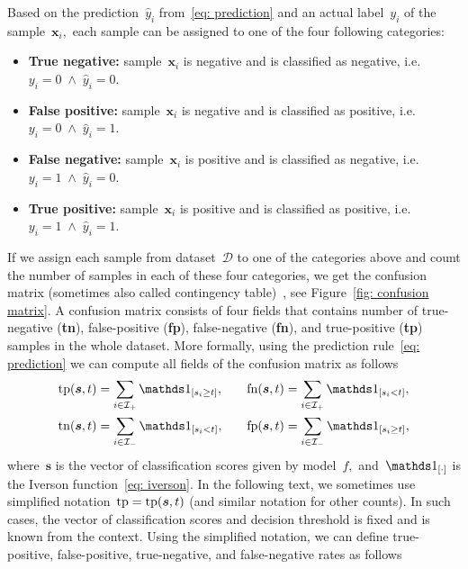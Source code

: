 Based on the prediction~$\hat{y}_i$ from~\eqref{eq: prediction} and an actual label~$y_i$ of the sample~$\bm{x}_i,$ each sample can be assigned to one of the four following categories:
\begin{itemize}
  \item \textbf{True negative:} sample~$\bm{x}_i$ is negative and is classified as negative, i.e.~$y_i = 0 \; \land \; \hat{y}_i = 0.$
  \item \textbf{False positive:} sample~$\bm{x}_i$ is negative and is classified as positive, i.e.~$y_i = 0 \; \land \; \hat{y}_i = 1.$
  \item \textbf{False negative:} sample~$\bm{x}_i$ is positive and is classified as negative, i.e.~$y_i = 1 \; \land \; \hat{y}_i = 0.$
  \item \textbf{True positive:} sample~$\bm{x}_i$ is positive and is classified as positive, i.e.~$y_i = 1 \; \land \; \hat{y}_i = 1.$
\end{itemize}
If we assign each sample from dataset~$\mathcal{D}$ to one of the categories above and count the number of samples in each of these four categories, we get the confusion matrix (sometimes also called contingency table)~\cite{fawcett2006introduction}, see Figure~\ref{fig: confusion matrix}. A confusion matrix consists of four fields that contains number of true-negative (\textbf{tn}), false-positive (\textbf{fp}), false-negative (\textbf{fn}), and true-positive (\textbf{tp}) samples in the whole dataset. More formally, using the prediction rule~\eqref{eq: prediction} we can compute all fields of the confusion matrix as follows
\begin{equation}\label{eq: confusion counts}
  \begin{aligned}
    \tp(\bm{s}, t) & = \sum_{i \in \Ipos}\Iverson{s_i \geq t}, & \quad
    \fn(\bm{s}, t) & = \sum_{i \in \Ipos}\Iverson{s_i < t}, \\
    \tn(\bm{s}, t) & = \sum_{i \in \Ineg}\Iverson{s_i < t}, & \quad
    \fp(\bm{s}, t) & = \sum_{i \in \Ineg}\Iverson{s_i \geq t},
  \end{aligned}
\end{equation}
where~$\bm{s}$ is the vector of classification scores given by model~$f,$ and~$\Iverson{\cdot}$ is the Iverson function~\eqref{eq: iverson}. In the following text, we sometimes use simplified notation~$\operatorname{tp} = \operatorname{tp}(\bm{s}, t)$ (and similar notation for other counts). In such cases, the vector of classification scores and decision threshold is fixed and is known from the context. Using the simplified notation, we can define true-positive, false-positive, true-negative, and false-negative rates as follows
